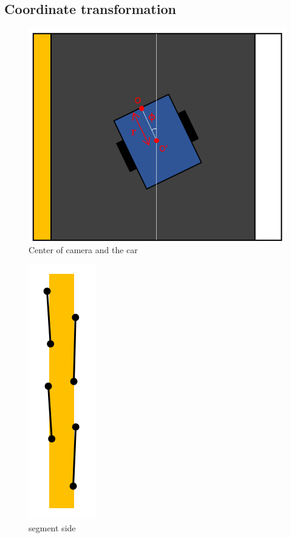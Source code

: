\documentclass{article}
\begin{document}
\subsection{Coordinate transformation}
\begin{figure} [ht]
  \centering\includegraphics[scale=0.5]{car_center.png}
  \caption{Center of camera and the car}
\end{figure}

\begin{figure} [h!]
  \centering\includegraphics[scale=0.5]{edge_side.png}
  \caption{segment side}
\end{figure}
\end{document}
